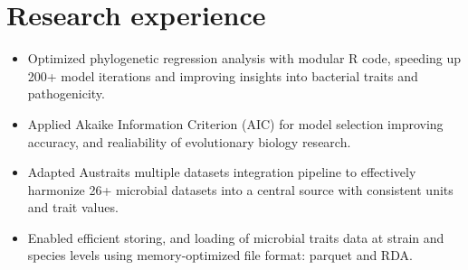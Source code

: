 \documentclass[12pt,a4paper,sans]{moderncv} %
\begin{document}
\section{Research experience}

{
}
{
    \begin{itemize} 
        \item Optimized phylogenetic regression analysis with modular R code, speeding up 200+ model iterations and improving insights into bacterial traits and pathogenicity.
        \item Applied Akaike Information Criterion (AIC) for model selection improving accuracy, and realiability of evolutionary biology research.
    \end{itemize}
}
{
    \begin{itemize} 
            \item Adapted Austraits multiple datasets integration pipeline to effectively harmonize 26+ microbial datasets into a central source with consistent units and trait values. 
            \item Enabled efficient storing, and loading of microbial traits data at strain and species levels using memory-optimized file format: parquet and RDA.
    \end{itemize}

}
\end{document}
